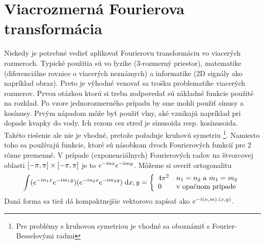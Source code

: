 \section{Viacrozmerná Fourierova transformácia}

Niekedy je potrebné vedieť aplikovať Fourierovu transformáciu vo
viacerých rozmeroch. Typické použitia sú vo fyzike (3-rozmerný
priestor), matematike (diferenciálne rovnice o viacerých neznámych) a
informatike (2D signály ako napríklad obraz). Preto je výhodné venovať
sa trošku problematike viacerých rozmerov. Prvou otázkou ktorú si
treba zodpovedať sú základné funkcie použité na rozklad. Po vzore
jednorozmerného prípadu by sme mohli použiť sínusy a kosínusy. Prvým
nápadom môže byť použiť vlny, aké vznikajú napríklad pri dopade kvapky
do vody. Ich rezom cez stred je sínusoida resp. kosínusoida. Takéto
riešenie ale nie je vhodné, pretože požaduje kruhovú
symetriu \footnote{Pre problémy s kruhovou symetriou je vhodné sa
oboznámiť s Fourier-Besselovými radmi}. Namiesto toho sa používajú
funkcie, ktoré sú násobkom dvoch Fourierových funkcií pre 2 rôzne
premenné. V prípade (exponenciálnych) Fourierových radov na štvorcovej oblasti
$[-\pi,\pi]\times[-\pi,\pi]$ je to
$e^{-\hat{\imath} n x} e^{-\hat{\imath} m y}$. Môžeme si overiť ortogonalitu
\begin{equation*}
 \int (e^{-\hat{\imath} n_1 x} e^{-\hat{\imath} m_1 y}) 
      (e^{-\hat{\imath} n_2 x} e^{-\hat{\imath} m_2 y}) \; \mathrm{d} x,y =
    \left\{
        \begin{array}{l l}
            4\pi^2& n_1 = n_2\text{ a }m_1 = m_2\\
            0& \text{v opačnom prípade}
        \end{array}
    \right.
\end{equation*}
Daná forma sa tiež dá kompaktnejšie vektorovo zapísať ako 
$e^{-\hat{\imath} (n,m).(x,y)}$.

